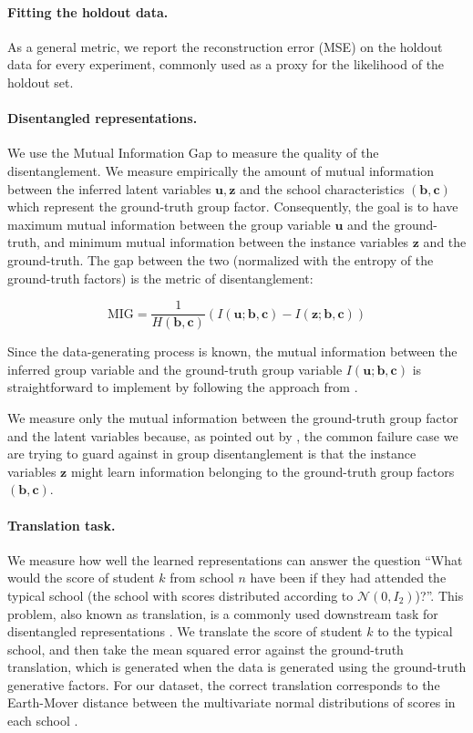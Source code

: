 \documentclass{article} %
\begin{document}
\paragraph{Fitting the holdout data.} As a general metric, we report the reconstruction error (MSE) on the holdout data for every experiment, commonly used as a proxy for the likelihood of the holdout set.

\paragraph{Disentangled representations.} We use the Mutual Information Gap \citep{Chen2018IsolatingSO} to measure the quality of the disentanglement. We measure empirically the amount of mutual information between the inferred latent variables $\mathbf{u},  \mathbf{z}$ and the school characteristics $(\mathbf{b}, \mathbf{c})$ which represent the ground-truth group factor. Consequently, the goal is to have maximum mutual information between the group variable $\mathbf{u}$ and the ground-truth, and minimum mutual information between the instance variables $\mathbf{z}$ and the ground-truth.  The gap between the two (normalized with the entropy of the ground-truth factors) is the metric of disentanglement:

\begin{equation}
\mathrm{MIG} = \frac{1}{H(\mathbf{b}, \mathbf{c})} (I(\mathbf{u}; \mathbf{b}, \mathbf{c}) - I(\mathbf{z}; \mathbf{b}, \mathbf{c}))
\end{equation}

Since the data-generating process is known, the mutual information between the inferred group variable and the ground-truth group variable $I(\mathbf{u}; \mathbf{b}, \mathbf{c})$ is straightforward to implement by following the approach from \citet{Chen2018IsolatingSO}.

We measure only the mutual information between the ground-truth group factor and the latent variables because,  as pointed out by \citet{Nmeth2020AdversarialDW}, the common failure case we are trying to guard against in group disentanglement is that the instance variables $\mathbf{z}$ might learn information belonging to the ground-truth group factors $(\mathbf{b}, \mathbf{c})$.

\paragraph{Translation task.} We measure how well the learned representations can answer the question ``What would the score of student $k$ from school $n$ have been if they had attended the typical school (the school with scores distributed according to $\mathcal{N} (0, I_2)$)?''. This problem, also known as translation, is a commonly used downstream task for disentangled representations \citep{Tenenbaum2000SeparatingSA}. We translate the score of student $k$ to the typical school, and then take the mean squared error against the ground-truth translation, which is generated when the data is generated using the ground-truth generative factors. For our dataset, the correct translation corresponds to the Earth-Mover distance between the multivariate normal distributions of scores in each school \citep{Knott1984On}.
\end{document}
